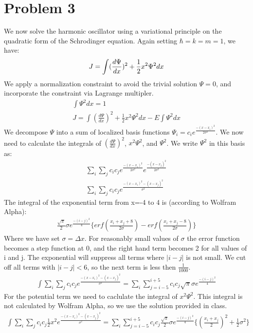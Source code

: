 \documentclass[a4paper,10pt]{article}
\numberwithin{equation}{section}
\begin{document}
\section{Problem 3}
We now solve the harmonic oscillator using a variational principle on the quadratic form of the Schrodinger equation.
Again setting $\hbar =k=m=1$, we have:
\begin{equation}
J=\int (\frac{d\Psi }{dx})^{2}+\frac{1}{2}x^2\Psi ^2 dx\\
\end{equation}
We apply a normalization constraint to avoid the trivial solution $\Psi=0$, and incorporate the constraint via Lagrange multipler.
\begin{gather}
\int \Psi^2 dx = 1\\
J=\int (\frac{d\Psi }{dx})^{2}+\frac{1}{2}x^2\Psi ^2 dx - E\int \Psi^2 dx
\end{gather}
We decompose $\Psi$ into a sum of localized basis functions $\Psi_i=c_ie^{\frac{-(x-x_i)^2}{2\sigma ^2}}$.
We now need to calculate the integrals of $(\frac{d\Psi }{dx})^{2}$, $x^2\Psi ^2$, and $\Psi^2$.
We write $\Psi^2$ in this basis as:
\begin{gather}
 \sum_{i}\sum_{j}c_ic_je^{\frac{-(x-x_i)^2}{2\sigma ^2}}e^{\frac{-(x-x_j)^2}{2\sigma ^2}}\\
 \sum_{i}\sum_{j}c_ic_je^{\frac{-(x-x_i)^2-(x-x_j)^2}{\sigma ^2}}
\end{gather}
The integral of the exponential term from x=-4 to 4 is (according to Wolfram Alpha):
\begin{gather}
\frac{\sqrt{\pi}}{2}\sigma e^{\frac{-(i-j)^2}{4}}\{erf(\frac{x_i+x_j+8}{2\sigma})-erf(\frac{x_i+x_j-8}{2\sigma})\}
\end{gather}
Where we have set $\sigma =\Delta x$. 
For reasonably small values of $\sigma$ the error function becomes a step function at 0, and the right hand term becomes 2 for all values of i and j.
The  exponential will suppress all terms where $|i-j|$ is not small. We cut off all terms with  $|i-j|<6$, so the next term is less then $\frac{1}{1000}$.
\begin{gather}
 \int  \sum_{i}\sum_{j}c_ic_je^{\frac{-(x-x_i)^2-(x-x_j)^2}{\sigma ^2}}=
 \sum_{i}\sum_{j=i-5}^{i+5}c_ic_j\sqrt{\pi}\sigma e^{\frac{-(i-j)^2}{4}}
\end{gather}
For the potential term we need to caclulate the integral of $x^2\Psi ^2$. 
This integral is not calculated by Wolfram Alpha, so we use the solution provided in class.
\begin{gather}
  \int  \sum_{i}\sum_{j}c_ic_j\frac{1}{2}x^{2}e^{\frac{-(x-x_i)^2-(x-x_j)^2}{\sigma ^2}}=
 \sum_{i}\sum_{j=i-5}^{i+5}c_ic_j\frac{\sqrt{\pi}}{2}\sigma e^{\frac{-(i-j)^2}{4}}\{ (\frac{x_i+x_j}{2})^2+\frac{1}{2}\sigma ^2\}
\end{gather}
\end{document}
